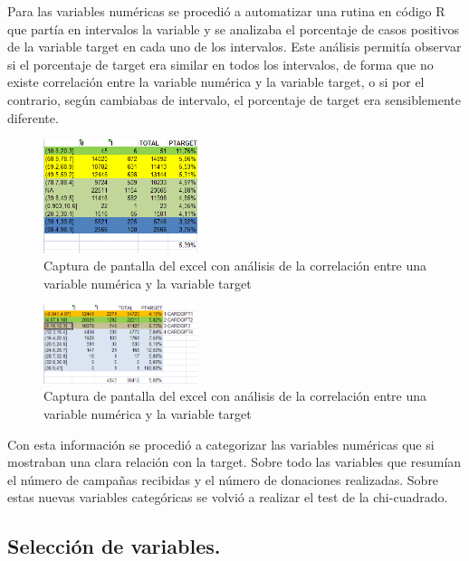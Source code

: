 Para las variables numéricas se procedió a automatizar una rutina en código R que partía en intervalos la variable y se analizaba el porcentaje de casos positivos de la variable target en cada uno de los intervalos. Este análisis permitía observar si el porcentaje de target era similar en todos los intervalos, de forma que no existe correlación entre la variable numérica y la variable target, o si por el contrario, según cambiabas de intervalo, el porcentaje de target era sensiblemente diferente.

\begin{figure}[H]
\begin{center}
\includegraphics[width=0.4\textwidth]{img/cuantitativa1}
\caption{Captura de pantalla del excel con análisis de la correlación entre una variable numérica y la variable target}
\end{center}
\end{figure}

\begin{figure}[H]
\begin{center}
\includegraphics[width=0.4\textwidth]{img/cuantitativa2}
\caption{Captura de pantalla del excel con análisis de la correlación entre una variable numérica y la variable target}
\end{center}
\end{figure}

Con esta información se procedió a categorizar las variables numéricas que si mostraban una clara relación con la target. Sobre todo las variables que resumían el número de campañas recibidas y el número de donaciones realizadas. Sobre estas nuevas variables categóricas se volvió a realizar el test de la chi-cuadrado.

\subsection{Selección de variables.}

